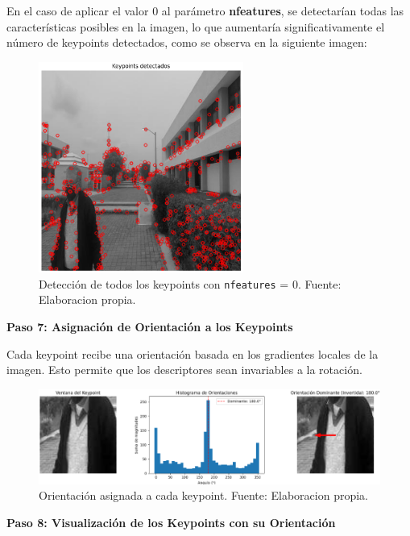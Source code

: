 \documentclass[a4paper]{article}
\begin{document}
En el caso de aplicar el valor 0 al parámetro \textbf{nfeatures}, se detectarían todas las características posibles en la imagen, lo que aumentaría significativamente el número de keypoints detectados, como se observa en la siguiente imagen:

\begin{figure}[H]
    \centering
    \includegraphics[width=0.6\textwidth]{images/sift_paso_5.png}
    \caption{Detección de todos los keypoints con \texttt{nfeatures} = 0. Fuente: Elaboracion propia.}
\end{figure}

\textbf{Paso 7: Asignación de Orientación a los Keypoints}
\par\vspace{0.5cm}

Cada keypoint recibe una orientación basada en los gradientes locales de la imagen. Esto permite que los descriptores sean invariables a la rotación.

\begin{figure}[H]
    \centering
    \includegraphics[width=1.1\textwidth]{images/sift_paso_6.1.png}
    \caption{Orientación asignada a cada keypoint. Fuente: Elaboracion propia.}
\end{figure}

\textbf{Paso 8: Visualización de los Keypoints con su Orientación}
\par\vspace{0.5cm}
\end{document}
